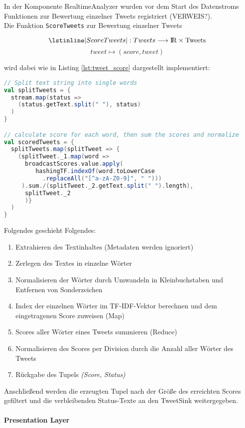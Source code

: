 In der Komponente RealtimeAnalyzer wurden vor dem Start des Datenstroms Funktionen zur Bewertung einzelner Tweets registriert (VERWEIS?).\\

Die Funktion \lstinline|ScoreTweets| zur Bewertung einzelner Tweets

\[\lstinline|ScoreTweets|: Tweets \longrightarrow \rm I\!R \times Tweets\]
\[tweet \mapsto (score, tweet)\]

wird dabei wie in Listing \ref{lst:tweet_score} dargestellt implementiert:

\begin{lstlisting}[language=Scala,caption={Bewertung von Tweets},label={lst:tweet_score}]
// Split text string into single words
val splitTweets = {
  stream.map(status =>
    (status.getText.split(" "), status)
  )
}

// calculate score for each word, then sum the scores and normalize
val scoredTweets = {
  splitTweets.map(splitTweet => {
    (splitTweet._1.map(word =>
      broadcastScores.value.apply(
         hashingTF.indexOf(word.toLowerCase
           .replaceAll("[^a-zA-Z0-9]", " ")))
     ).sum./(splitTweet._2.getText.split(" ").length),
      splitTweet._2
      )}
  )
}
\end{lstlisting}

Folgendes geschieht Folgendes:
\begin{enumerate}
	\item Extrahieren des Textinhaltes (Metadaten werden ignoriert)
	\item Zerlegen des Textes in einzelne Wörter
	\item Normalisieren der Wörter durch Umwandeln in Kleinbuchstaben und Entfernen von Sonderzeichen
	\item Index der einzelnen Wörter im TF-IDF-Vektor berechnen und dem eingetragenen Score zuweisen (Map)
	\item Scores aller Wörter eines Tweets summieren (Reduce)
	\item Normalisieren des Scores per Division durch die Anzahl aller Wörter des Tweets
	\item Rückgabe des Tupels \textit{(Score, Status)}
\end{enumerate}

Anschließend werden die erzeugten Tupel nach der Größe des erreichten Scores gefiltert und die verbleibenden Status-Texte an den TweetSink weitergegeben.\\

\paragraph{Presentation Layer}\\
\\

